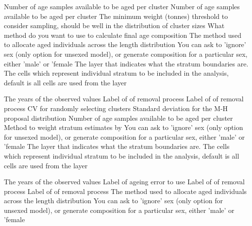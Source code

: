  {Number of age samples available to be aged per cluster}
 {Number of age samples available to be aged per cluster}
 {The minimum weight (tonnes) threshold to consider sampling, should be well in the distribution of cluster sizes}
 {What method do you want to use to calculate final age composition}
 {The method used to allocate aged individuals across the length distribution}
 {You can ask to 'ignore' sex (only option for unsexed model), or generate composition for a particular sex, either 'male' or 'female}
 {The layer that indicates what the stratum boundaries are.}
 {The cells which represent individual stratum to be included in the analysis, default is all cells are used from the layer}
\par\textbf{}\par
{} {The years of the observed values}
 {Label of of removal process}
 {Label of of removal process}
 {CV for randomly selecting clusters}
 {}
 {Standard deviation for the M-H proposal distribution}
 {Number of age samples available to be aged per cluster}
 {Method to weight stratum estimates by}
 {You can ask to 'ignore' sex (only option for unsexed model), or generate composition for a particular sex, either 'male' or 'female}
 {The layer that indicates what the stratum boundaries are.}
 {The cells which represent individual stratum to be included in the analysis, default is all cells are used from the layer}
\par\textbf{}\par
{} {The years of the observed values}
 {Label of ageing error to use}
 {Label of of removal process}
 {Label of of removal process}
 {The method used to allocate aged individuals across the length distribution}
 {You can ask to 'ignore' sex (only option for unsexed model), or generate composition for a particular sex, either 'male' or 'female}
